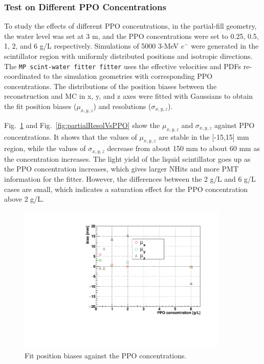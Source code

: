 \subsubsection{Test on Different PPO Concentrations}\label{sect:ppoConcentration}
To study the effects of different PPO concentrations, in the partial-fill geometry, the water level was set at 3 m, and the PPO concentrations were set to 0.25, 0.5, 1, 2, and 6 g/L respectively. Simulations of 5000 3-MeV $e^-$ were generated in the scintillator region with uniformly distributed positions and isotropic directions. The \texttt{MP scint-water fitter fitter} uses the effective velocities and PDFs re-coordinated to the simulation geometries with corresponding PPO concentrations. The distributions of the position biases between the reconstruction and MC in x, y, and z axes were fitted with Gaussians to obtain the fit position biases ($\mu_{x,y,z}$) and resolutions ($\sigma_{x,y,z}$).

Fig.~\ref{fig:partialBiasVsPPO} and Fig.~\ref{fig:partialResolVsPPO} show the $\mu_{x,y,z}$ and $\sigma_{x,y,z}$ against PPO concentrations. It shows that the values of $\mu_{x,y,z}$ are stable in the [-15,15] mm region, while the values of $\sigma_{x,y,z}$ decrease from about 150 mm to about 60 mm as the concentration increases. The light yield of the liquid scintillator goes up as the PPO concentration increases, which gives larger NHits and more PMT information for the fitter. However, the differences between the 2 g/L and 6 g/L cases are small, which indicates a saturation effect for the PPO concentration above 2 g/L.

\begin{figure}[!htb]
	\centering
	\includegraphics[width=10cm]{partialBiasVsPPO.pdf}
	\caption{Fit position biases against the PPO concentrations.}
	\label{fig:partialBiasVsPPO}
\end{figure}

